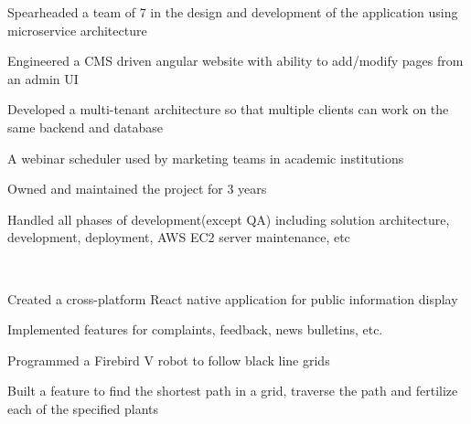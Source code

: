 \documentclass[]{deedy-resume-openfont}
\begin{document}
\begin{minipage}[t]{0.66\textwidth}
\begin{tightemize}
    \item Spearheaded a team of 7 in the design and development of the application using microservice architecture
    \item Engineered a CMS driven angular website with ability to add/modify pages from an admin UI
    \item Developed a multi-tenant architecture so that multiple clients can work on the same backend and database
\end{tightemize}
\sectionsep

\begin{tightemize}
    \item A webinar scheduler used by marketing teams in academic institutions
    \item Owned and maintained the project for 3 years
    \item Handled all phases of development(except QA) including solution architecture, development, deployment, AWS EC2 server maintenance, etc
\end{tightemize}
\sectionsep

\\
\begin{tightemize}
    \item Created a cross-platform React native application for public information display
    \item Implemented features for complaints, feedback, news bulletins, etc.
\end{tightemize}
\sectionsep

\begin{tightemize}
    \item Programmed a Firebird V robot to follow black line grids
    \item Built a feature to find the shortest path in a grid, traverse the path and fertilize each of the specified plants
\end{tightemize}
\sectionsep



\end{minipage}
\end{document}
